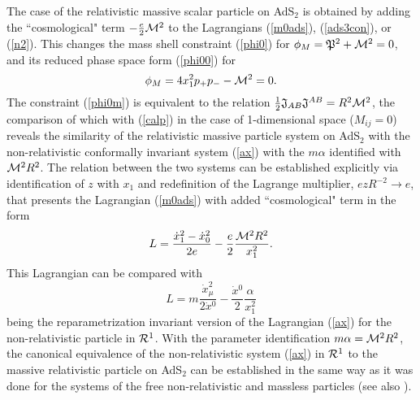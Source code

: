 \documentclass[a4paper,12pt]{article}
\def\P{\mathfrak P}
\def\J{\mathfrak J}
\begin{document}
The case of the relativistic massive scalar particle
on AdS${}_2$ is obtained by adding
the ``cosmological" term $-\frac{e}{2}{\cal M}^2$
to the Lagrangians (\ref{m0ads}),
(\ref{ads3con}), or (\ref{n2}).
This changes the mass shell constraint
(\ref{phi0}) for $\phi_M=\P^2+{\cal M}^2=0$, and its reduced
phase
space  form
(\ref{phi00}) for
\begin{equation}
\phi_M=4x_1^2p_+p_--{\cal M}^2=0.
\label{phi0m}
\end{equation}
The constraint (\ref{phi0m}) is equivalent to the
relation $\frac{1}{2}\J_{AB}\J^{AB}=R^2{\cal M}^2$,
the comparison of which with (\ref{calp}) in the case
of 1-dimensional space ($M_{ij}=0$)
reveals the similarity of the relativistic
massive particle system on AdS${}_2$ with
the non-relativistic conformally invariant
system (\ref{ax}) with the
$m\alpha$ identified with ${\cal M}^2R^2$.
The relation between the two systems
can be established explicitly
via identification of  $z$ with
$x_1$ and
redefinition of the Lagrange multiplier,
$ezR^{-2}\rightarrow e$,
that presents the Lagrangian (\ref{m0ads}) with added
``cosmological" term in the form
\begin{equation}
L=\frac{\dot{x}_1^2-\dot{x}_0^2}{2e}
-\frac{e}{2}\frac{{\cal M}^2R^2}{x_1^2}.
\label{lagmasads}
\end{equation}
This Lagrangian can be compared with
\begin{equation}
L=m\frac{\dot{x}_\mu^2}{2\dot{x}{}^0}
-\frac{\dot{x}{}^0}{2}\frac{\alpha}{x_1^2}
\label{repar2}
\end{equation}
being the reparametrization invariant version
of the Lagrangian (\ref{ax})
for the non-relativistic particle in ${\cal R}^1$.
With the parameter identification
$m\alpha={\cal M}^2R^2$,
the canonical equivalence of the non-relativistic
system (\ref{ax}) in ${\cal R}^1$ to the
massive relativistic particle on AdS${}_2$
can be established in the same way as it was done for the
systems of
the free non-relativistic and massless
particles (see also \cite{Bell}).
\end{document}
